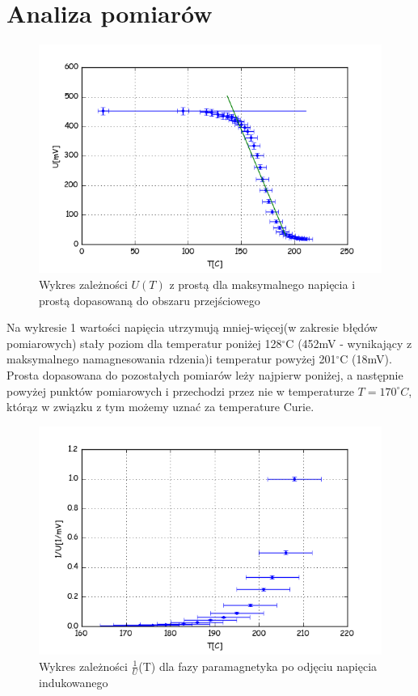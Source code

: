\documentclass[a4paper,10pt]{article}
\begin{document}
\section{Analiza pomiarów}

\begin{figure}[H]
  \includegraphics{./Curie_proste.png}
  \caption{Wykres zależności $U(T)$ z prostą dla maksymalnego napięcia i prostą dopasowaną do obszaru przejściowego}
\end{figure}

Na wykresie 1 wartości napięcia utrzymują mniej-więcej(w zakresie błędów pomiarowych) stały poziom dla temperatur poniżej 128$^\circ$C (452mV
- wynikający z maksymalnego namagnesowania rdzenia)i temperatur powyżej 201$^\circ$C (18mV). Prosta dopasowana do pozostałych pomiarów leży najpierw
poniżej, a następnie powyżej punktów pomiarowych i przechodzi przez nie w temperaturze $T = 170^\circ C$, którąz w związku z tym możemy uznać za
temperature Curie.

\begin{figure}[H]
  \includegraphics{./Curie_odwrotnosc.png}
  \caption{Wykres zależności $\frac{1}{U}$(T) dla fazy paramagnetyka po odjęciu napięcia indukowanego}
\end{figure}
\end{document}

